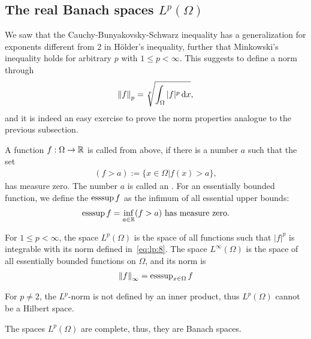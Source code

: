 \subsection{The real Banach spaces $L^p(\Omega)$}

\begin{intro}
  We saw that the Cauchy-Bunyakovsky-Schwarz inequality has a
  generalization for exponents different from 2 in Hölder's
  inequality, further that Minkowski's inequality holds for arbitrary
  $p$ with $1\le p<\infty$. This suggests to define a norm through
  \begin{gather}
    \label{eq:lp:8}
    \left\|f\right\|_p = \sqrt[p] {\int_\Omega |f|^p \,\mathrm{d} x},
  \end{gather}
  and it is indeed an easy exercise to prove the norm properties
  analogue to the previous subsection.
\end{intro}

\begin{definition}
  A function $f:\Omega \to \mathbb R$ is called 
  from above, if there is a number $a$ such that the set
  \begin{gather*}
    (f>a) := \bigl\{x\in\Omega \big| f(x)>a \bigr\},
  \end{gather*}
  has measure zero. The number $a$ is called an . For an essentially bounded function, we define the
   $\operatorname{ess sup} f$ as the infimum of all
  essential upper bounds:
  \begin{gather*}
    \operatorname{ess sup} f = \inf_{a\in \mathbb R} (f>a) \text{ has measure zero.}
  \end{gather*}
\end{definition}

\begin{definition}
  For $1\le p < \infty$, the space $L^p(\Omega)$ is the space of all
  functions such that $|f|^p$ is integrable with its norm defined
  in~\eqref{eq:lp:8}. The space $L^\infty(\Omega)$ is the space of all
  essentially bounded functions on $\Omega$, and its norm is
  \begin{gather*}
    \left\|f\right\|_\infty = \operatorname{ess sup}_{x\in\Omega} f
  \end{gather*}
\end{definition}

\begin{note}
  For $p\neq2$, the $L^p$-norm is not defined by an inner product,
  thus $L^p(\Omega)$ cannot be a Hilbert space.
\end{note}

\begin{theorem}
  The spaces $L^p(\Omega)$ are complete, thus, they are Banach spaces.
\end{theorem}

